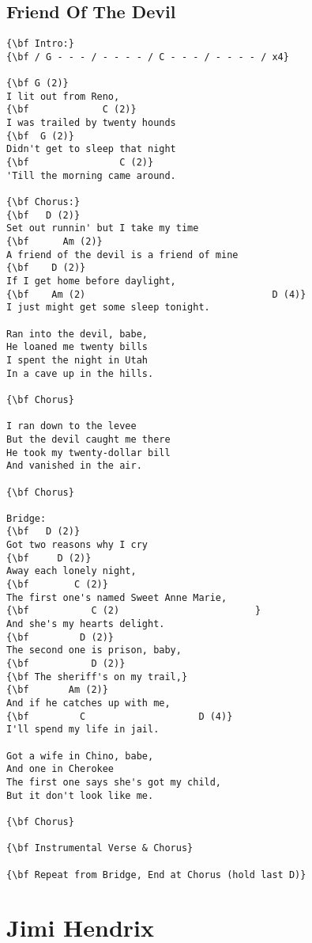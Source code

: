 \documentclass[a4paper]{article}
\begin{document}
\subsection{Friend Of The Devil}
\begin{Verbatim}[commandchars=\\\{\}]
{\bf Intro:}
{\bf / G - - - / - - - - / C - - - / - - - - / x4}

{\bf G (2)}
I lit out from Reno,
{\bf             C (2)}
I was trailed by twenty hounds
{\bf  G (2)}
Didn't get to sleep that night
{\bf                C (2)}
'Till the morning came around.

{\bf Chorus:}
{\bf   D (2)}
Set out runnin' but I take my time
{\bf      Am (2)}
A friend of the devil is a friend of mine
{\bf    D (2)}
If I get home before daylight,
{\bf    Am (2)                                 D (4)}
I just might get some sleep tonight.

Ran into the devil, babe,
He loaned me twenty bills
I spent the night in Utah
In a cave up in the hills.

{\bf Chorus}

I ran down to the levee
But the devil caught me there
He took my twenty-dollar bill
And vanished in the air.

{\bf Chorus}

Bridge:
{\bf   D (2)}
Got two reasons why I cry
{\bf     D (2)}
Away each lonely night,
{\bf        C (2)}
The first one's named Sweet Anne Marie,
{\bf           C (2)                        }
And she's my hearts delight.
{\bf         D (2)}
The second one is prison, baby,
{\bf           D (2)}
{\bf The sheriff's on my trail,}
{\bf       Am (2)}
And if he catches up with me,
{\bf         C                    D (4)}
I'll spend my life in jail.

Got a wife in Chino, babe,
And one in Cherokee
The first one says she's got my child,
But it don't look like me.

{\bf Chorus}

{\bf Instrumental Verse & Chorus}

{\bf Repeat from Bridge, End at Chorus (hold last D)}

\end{Verbatim}
\newpage
\section{Jimi Hendrix}
\end{document}
